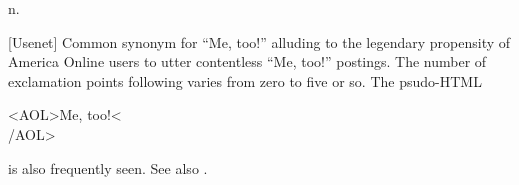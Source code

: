 n.

[Usenet] Common synonym for ``Me, too!'' alluding to the legendary propensity of America Online users to utter contentless ``Me, too!''
postings. The number of exclamation points following varies from zero to five or so. The psudo-HTML

\begin{usenet}
	<AOL>Me, too!<\\/AOL>
\end{usenet}

is also frequently seen. See also .

